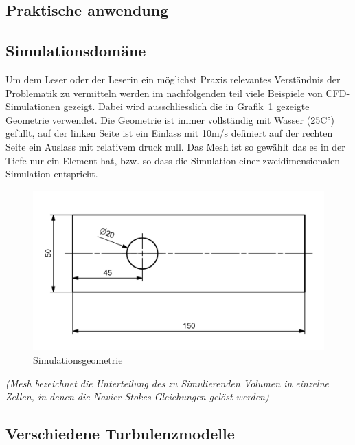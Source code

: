 \begin{refsection}



\section{Praktische anwendung}

\subsection{Simulationsdomäne}
\label{subsubsec:domain-desc}

Um dem Leser oder der Leserin ein möglichst Praxis relevantes Verständnis der Problematik zu vermitteln werden im nachfolgenden teil viele Beispiele von CFD-Simulationen gezeigt.
Dabei wird ausschliesslich die in Grafik~\ref{fig:SimDomain} gezeigte Geometrie verwendet.
Die Geometrie ist immer vollständig mit Wasser (25C°) gefüllt,
auf der linken Seite ist ein Einlass mit 10m/s definiert auf der rechten Seite ein Auslass mit relativem druck null.
Das Mesh ist so gewählt das es in der Tiefe nur ein Element hat, bzw. so dass die Simulation einer zweidimensionalen Simulation entspricht.

\begin{figure}
    \includegraphics[width=\textwidth]{papers/reynolds/images/domain.png}
    \caption{Simulationsgeometrie}
    \label{fig:SimDomain}
\end{figure}

\textit{(Mesh bezeichnet die Unterteilung des zu Simulierenden Volumen in einzelne Zellen, in denen die Navier Stokes Gleichungen gelöst werden)}

\subsection{Verschiedene Turbulenzmodelle}


\end{refsection}
